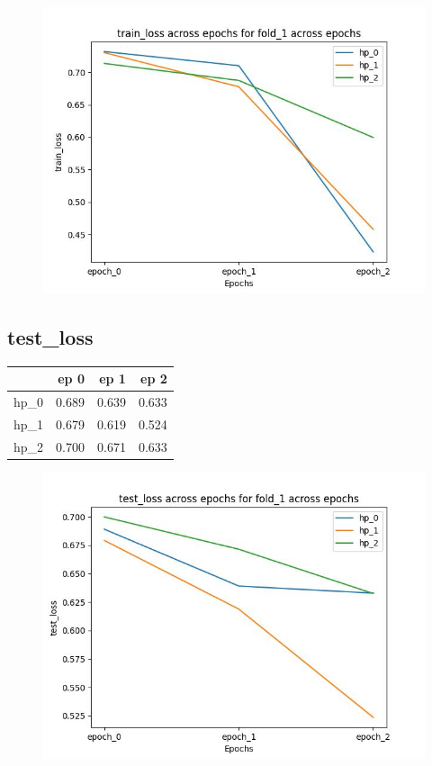\documentclass{article}
\begin{document}
\begin{figure}[H]
\includegraphics[scale = 0.75]{fold_1/train_loss}
\end{figure}
\subsection{test\_loss}
\begin{tabular}{lrrr}
\toprule
{} &   ep 0 &   ep 1 &   ep 2 \\
\midrule
hp\_0 &  0.689 &  0.639 &  0.633 \\
hp\_1 &  0.679 &  0.619 &  0.524 \\
hp\_2 &  0.700 &  0.671 &  0.633 \\
\bottomrule
\end{tabular}

\begin{figure}[H]
\includegraphics[scale = 0.75]{fold_1/test_loss}
\end{figure}
\end{document}
